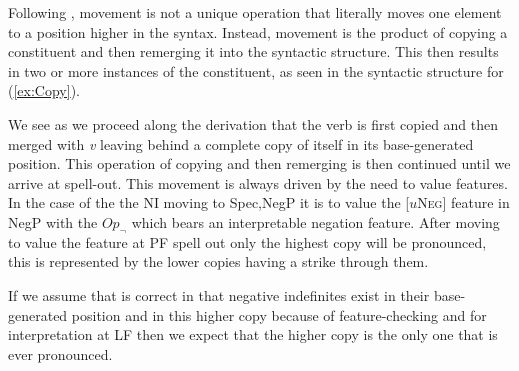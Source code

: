 \documentclass[12pt, letterpaper]{article}
\begin{document}
Following \citeauthor{chomskyMinimalistProgramLinguistic1993}, movement is not a unique operation that literally moves one element to a position higher in the syntax. Instead, movement is the product of copying a constituent and then remerging it into the syntactic structure. This then results in two or more instances of the constituent, as seen in the syntactic structure for (\ref{ex:Copy}). 

We see as we proceed along the derivation that the verb is first copied and then merged with \emph{v} leaving behind a complete copy of itself in its base-generated position. This operation of copying and then remerging is then continued until we arrive at spell-out. This movement is always driven by the need to value features. In the case of the the NI moving to Spec,NegP it is to value the [{$u$\textsc{Neg}}] feature in NegP with the $Op_\neg$ which bears an interpretable negation feature. After moving to value the feature at PF spell out only the highest copy will be pronounced, this is represented by the lower copies having a strike through them. 
\ea \label{ex:Copy}
\z 

If we assume that \citet{zeijlstraSyntacticallyComplexStatus2011} is correct in that negative indefinites exist in their base-generated position and in this higher copy because of feature-checking and for interpretation at LF then we expect that the higher copy is the only one that is ever pronounced.
\end{document}
